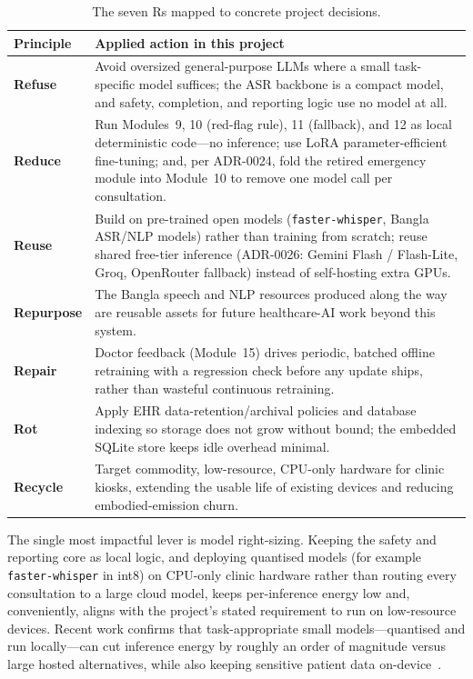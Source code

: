 \documentclass[11pt,a4paper]{article}
\begin{document}
\begin{table}[h]
\centering
\footnotesize
\caption{The seven Rs mapped to concrete project decisions.}
\label{tab:sevenrs}
\begin{tabularx}{\textwidth}{@{}p{2.1cm}L@{}}
\toprule
\textbf{Principle} & \textbf{Applied action in this project}\\
\midrule
\textbf{Refuse} & Avoid oversized general-purpose LLMs where a small task-specific model suffices; the ASR backbone is a compact model, and safety, completion, and reporting logic use no model at all.\\
\textbf{Reduce} & Run Modules~9, 10 (red-flag rule), 11 (fallback), and 12 as local deterministic code---no inference; use LoRA parameter-efficient fine-tuning; and, per ADR-0024, fold the retired emergency module into Module~10 to remove one model call per consultation.\\
\textbf{Reuse} & Build on pre-trained open models (\texttt{faster-whisper}, Bangla ASR/NLP models) rather than training from scratch; reuse shared free-tier inference (ADR-0026: Gemini Flash / Flash-Lite, Groq, OpenRouter fallback) instead of self-hosting extra GPUs.\\
\textbf{Repurpose} & The Bangla speech and NLP resources produced along the way are reusable assets for future healthcare-AI work beyond this system.\\
\textbf{Repair} & Doctor feedback (Module~15) drives periodic, batched offline retraining with a regression check before any update ships, rather than wasteful continuous retraining.\\
\textbf{Rot} & Apply EHR data-retention/archival policies and database indexing so storage does not grow without bound; the embedded SQLite store keeps idle overhead minimal.\\
\textbf{Recycle} & Target commodity, low-resource, CPU-only hardware for clinic kiosks, extending the usable life of existing devices and reducing embodied-emission churn.\\
\bottomrule
\end{tabularx}
\end{table}

The single most impactful lever is model right-sizing. Keeping the safety and reporting
core as local logic, and deploying quantised models (for example \texttt{faster-whisper}
in int8) on CPU-only clinic hardware rather than routing every consultation to a large
cloud model, keeps per-inference energy low and, conveniently, aligns with the project's
stated requirement to run on low-resource devices. Recent work confirms that
task-appropriate small models---quantised and run locally---can cut inference energy by
roughly an order of magnitude versus large hosted alternatives, while also keeping
sensitive patient data on-device~\cite{luccioni2024}.
\end{document}
